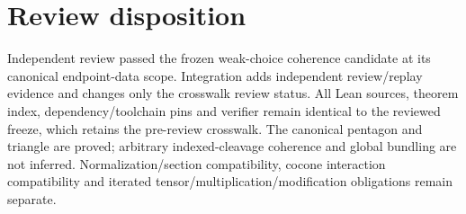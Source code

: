 \documentclass{article}
\begin{document}
\section*{Review disposition}
Independent review passed the frozen weak-choice coherence candidate at its canonical endpoint-data scope. Integration adds independent review/replay evidence and changes only the crosswalk review status. All Lean sources, theorem index, dependency/toolchain pins and verifier remain identical to the reviewed freeze, which retains the pre-review crosswalk. The canonical pentagon and triangle are proved; arbitrary indexed-cleavage coherence and global bundling are not inferred. Normalization/section compatibility, cocone interaction compatibility and iterated tensor/multiplication/modification obligations remain separate.
\end{document}

